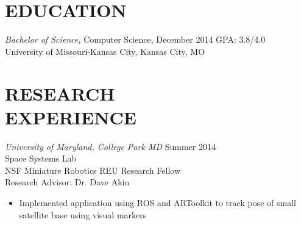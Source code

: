 \documentclass[line,margin]{res}
\begin{document}
\address{\hfill victoria.chen.wu@gmail.com  \textbar \textbar \hspace{1 mm} vptarmigan.wordpress.com \textbar \textbar \hspace{1 mm} (913) 235 - 1070 
} 

 
\begin{resume}
 
\section{EDUCATION} {\sl Bachelor of Science,} Computer Science, December 2014 	\hfill GPA: 3.8/4.0\\
                University of Missouri-Kansas City, Kansas City, MO 
\section {RESEARCH \\ EXPERIENCE}
		{\sl University of Maryland, College Park MD}  \hfill  Summer 2014\\
		Space Systems Lab\\
		NSF Miniature Robotics REU Research Fellow \\
		Research Advisor: Dr. Dave Akin 
                 \begin{itemize}[leftmargin=5mm]  \itemsep -2pt %
		 \item Implemented application using ROS and ARToolkit to track pose of small satellite base using visual markers

         \end{itemize} 
		

\end{resume}
\end{document}
